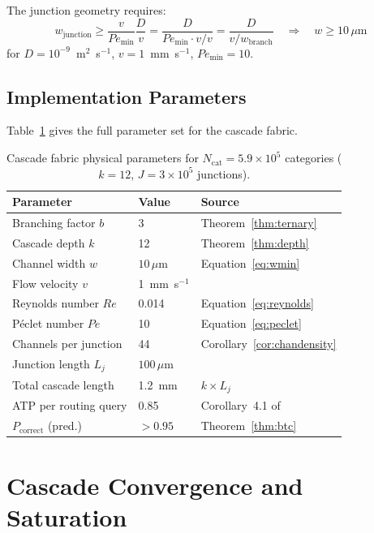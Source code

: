 \documentclass[11pt,twocolumn,a4paper]{article}
\theoremstyle{remark}
\begin{document}
The junction geometry requires:
\begin{equation}
w_{\mathrm{junction}} \geq \frac{v}{Pe_{\mathrm{min}}} \frac{D}{v}
= \frac{D}{Pe_{\mathrm{min}} \cdot v / v} = \frac{D}{v / w_{\mathrm{branch}}}
\quad \Rightarrow \quad w \geq 10\,\mu\mathrm{m}
\label{eq:wmin}
\end{equation}
for $D = 10^{-9}$~m$^2$~s$^{-1}$, $v = 1$~mm~s$^{-1}$, $Pe_{\mathrm{min}} = 10$.

\subsection{Implementation Parameters}

Table~\ref{tab:params} gives the full parameter set for the cascade fabric.

\begin{table}[h]
\centering
\small
\caption{Cascade fabric physical parameters for $N_{\mathrm{cat}} = 5.9 \times 10^5$
categories ($k = 12$, $J = 3 \times 10^5$ junctions).}
\label{tab:params}
\setlength{\tabcolsep}{4pt}
\begin{tabular}{lll}
\toprule
Parameter & Value & Source \\
\midrule
Branching factor $b$ & 3 & Theorem~\ref{thm:ternary} \\
Cascade depth $k$ & 12 & Theorem~\ref{thm:depth} \\
Channel width $w$ & $10\,\mu$m & Equation~\eqref{eq:wmin} \\
Flow velocity $v$ & 1~mm~s$^{-1}$ & \\
Reynolds number $Re$ & 0.014 & Equation~\eqref{eq:reynolds} \\
Péclet number $Pe$ & 10 & Equation~\eqref{eq:peclet} \\
Channels per junction & 44 & Corollary~\ref{cor:chandensity} \\
Junction length $L_j$ & $100\,\mu$m & \\
Total cascade length & 1.2~mm & $k \times L_j$ \\
ATP per routing query & 0.85 & Corollary~4.1 of \citep{companion4} \\
$P_{\mathrm{correct}}$ (pred.) & $> 0.95$ & Theorem~\ref{thm:btc} \\
\bottomrule
\end{tabular}
\end{table}

\section{Cascade Convergence and Saturation}
\label{sec:convergence}
\end{document}
